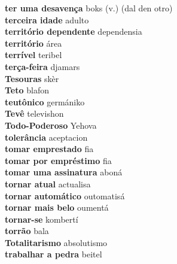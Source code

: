 \textbf{ ter uma desavença  } boks (v.) (dal den otro) \\
\textbf{ terceira idade  } adulto \\
\textbf{ território dependente  } dependensia \\
\textbf{ território  } área \\
\textbf{ terrível  } teribel \\
\textbf{ terça-feira  } djamars \\
\textbf{ Tesouras  } skèr \\
\textbf{ Teto  } blafon \\
\textbf{ teutônico  } germániko \\
\textbf{ Tevê  } televishon \\
\textbf{ Todo-Poderoso  } Yehova \\
\textbf{ tolerância  } aceptacion \\
\textbf{ tomar emprestado  } fia \\
\textbf{ tomar por empréstimo  } fia \\
\textbf{ tomar uma assinatura  } aboná \\
\textbf{ tornar atual  } actualisa \\
\textbf{ tornar automático  } outomatisá \\
\textbf{ tornar mais belo  } oumentá \\
\textbf{ tornar-se  } kombertí \\
\textbf{ torrão  } bala \\
\textbf{ Totalitarismo  } absolutismo \\
\textbf{ trabalhar a pedra  } beitel \\
